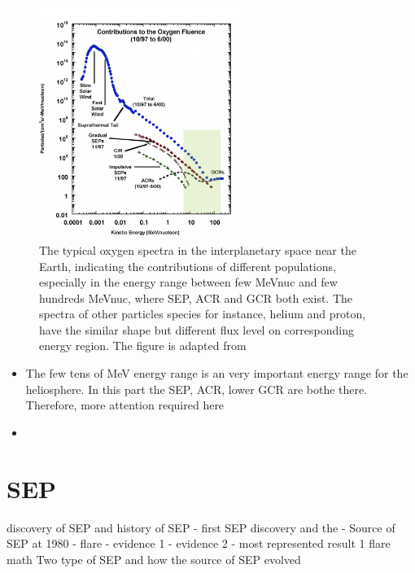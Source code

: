 \begin{figure}
	\centering
	\includegraphics[width = 0.6\textwidth]{images/heliospheric_particle_spectra_color.png}
	\caption[Energy spectra of oxygen ions in the near Earth space]{The typical oxygen spectra in the interplanetary space near the Earth, indicating the contributions of different populations, especially in the energy range between few MeV\/nuc and few hundreds MeV\/nuc, where \acs{SEP}, \acs{ACR} and \acs{GCR} both exist. The spectra of other particles species for instance, helium and proton, have the similar shape but different flux level on corresponding energy region. The figure is adapted from \cite{Mewaldt-2001}}
	\label{Fig:Oxygen_spectra_heliosphere}
\end{figure}

\begin{itemize}
	\item The few tens of MeV energy range is an very important energy range for the heliosphere. In this part the SEP, ACR, lower GCR are bothe there. Therefore, more attention required here
	\item 
\end{itemize}

\section{SEP}

discovery of SEP and history of SEP
- first SEP discovery and the 
-  Source of SEP at 1980 - flare
 - evidence 1
 - evidence 2
 - most represented result 1
flare math
Two type of SEP and how the source of SEP evolved

